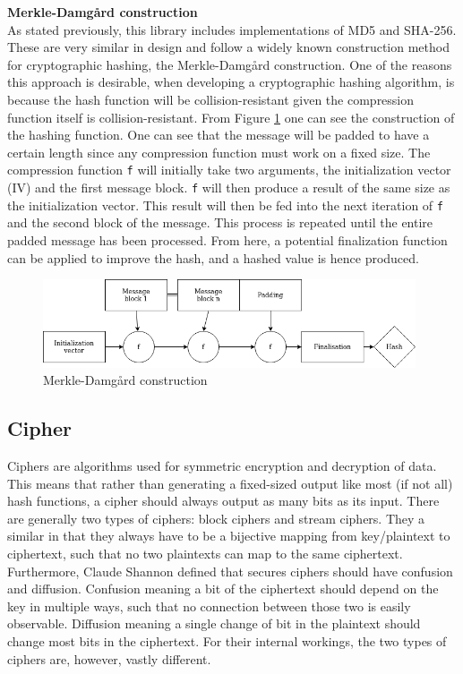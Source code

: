 \documentclass[a4paper, openany]{book}
\begin{document}
\begin{abstact}
\textbf{Merkle-Damgård construction}\\
As stated previously, this library includes implementations of MD5 and SHA-256. These are very similar in design and follow a widely known construction method for cryptographic hashing, the Merkle-Damgård construction. One of the reasons this approach is desirable, when developing a cryptographic hashing algorithm, is because the hash function will be collision-resistant given the compression function itself is collision-resistant\cite{Merkle}.
From Figure \ref{fig:Merkle} one can see the construction of the hashing function. One can see that the message will be padded to have a certain length since any compression function must work on a fixed size. The compression function \texttt{f} will initially take two arguments, the initialization vector (IV) and the first message block. \texttt{f} will then produce a result of the same size as the initialization vector. This result will then be fed into the next iteration of \texttt{f} and the second block of the message. This process is repeated until the entire padded message has been processed. From here, a potential finalization function can be applied to improve the hash, and a hashed value is hence produced.

\begin{figure}[H]
\centering
\includegraphics[width=11cm]{merkle.png}
\caption{Merkle-Damgård construction}
\label{fig:Merkle}
\end{figure}
\subsection{Cipher}
\label{sec:org48d3bf2}
\label{sec:cipher}
Ciphers are algorithms used for symmetric encryption and decryption of data. This means that rather than generating a fixed-sized output like most (if not all) hash functions, a cipher should always output as many bits as its input. There are generally two types of ciphers: block ciphers and stream ciphers. They a similar in that they always have to be a bijective mapping from key/plaintext to ciphertext, such that no two plaintexts can map to the same ciphertext. Furthermore, Claude Shannon defined\cite{Shannon} that secures ciphers should have confusion and diffusion. Confusion meaning a bit of the ciphertext should depend on the key in multiple ways, such that no connection between those two is easily observable. Diffusion meaning a single change of bit in the plaintext should change most bits in the ciphertext. For their internal workings, the two types of ciphers are, however, vastly different.\\


\end{abstact}
\end{document}
